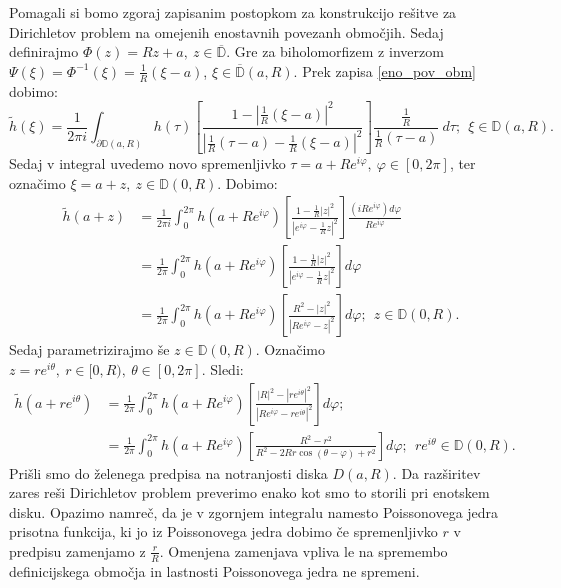 \documentclass[mat1]{fmfdelo}
\begin{document}
     \begin{dokaz}
        Pomagali si bomo zgoraj zapisanim postopkom za konstrukcijo rešitve za \mbox{Dirichletov} problem na omejenih enostavnih povezanh območjih. 
        Sedaj definirajmo $\Phi(z) = Rz + a,~z \in \overline{\mathbb{D}}$. Gre za biholomorfizem z inverzom \mbox{$\Psi(\xi) = \Phi^{-1}(\xi) = \frac{1}{R}(\xi - a)$}, $\xi \in \overline{\mathbb{D}}(a,R)$.
        Prek zapisa \eqref{eno_pov_obm} dobimo:
        $$ 
        \widetilde{h}(\xi) = \frac{1}{2\pi i}\int_{\partial \mathbb{D}(a,R)}{h(\tau) \left[\frac{1 - |\frac{1}{R}(\xi - a)|^2}{|\frac{1}{R}(\tau - a) - \frac{1}{R}(\xi - a)|^2}\right]\frac{\frac{1}{R}}{\frac{1}{R}(\tau - a)}~d \tau};~~\xi \in \mathbb{D}(a,R). 
        $$
        Sedaj v integral uvedemo novo spremenljivko $\tau = a + Re^{i \varphi},~\varphi \in [0,2\pi]$, ter označimo $\xi = a + z,~z \in \mathbb{D}(0, R)$. Dobimo:
        \begin{align*}
            \widetilde{h}(a + z) &= \frac{1}{2\pi i}\int_{0}^{2 \pi}{h(a + R e^{i \varphi}) \left[\frac{1 - \frac{1}{R}|z|^2}{|e^{i \varphi} - \frac{1}{R} z|^2}\right]\frac{(i R e^{i \varphi}) d \varphi}{R e^{i \varphi}}}\\
            & = \frac{1}{2 \pi}\int_{0}^{2 \pi}{h(a + R e^{i \varphi}) \left[\frac{1 - \frac{1}{R}|z|^2}{|e^{i \varphi} - \frac{1}{R} z|^2}\right]d\varphi}\\
            & = \frac{1}{2 \pi}\int_{0}^{2 \pi}{h(a + R e^{i \varphi}) \left[\frac{R^2 - |z|^2}{|R e^{i \varphi} - z|^2}\right]d\varphi};~~z \in \mathbb{D}(0,R).
        \end{align*}
        Sedaj parametrizirajmo še $z \in \mathbb{D}(0,R)$. Označimo $z = r e^{i \theta},~r \in [0,R),~\theta \in [0,2 \pi]$. Sledi:
        \begin{align*}
            \widetilde{h}(a + r e^{i \theta}) &= \frac{1}{2 \pi}\int_{0}^{2 \pi}{h(a + R e^{i \varphi}) \left[\frac{|R|^2 - |r e^{i \theta}|^2}{|R e^{i \varphi} - r e^{i \theta}|^2}\right]d\varphi}; \\
            & = \frac{1}{2 \pi}\int_{0}^{2 \pi}{h(a + R e^{i \varphi}) \left[\frac{R^2 - r^2}{R^2 - 2Rr \cos(\theta - \varphi) + r^2}\right]d\varphi};~~r e^{i \theta} \in \mathbb{D}(0,R).
        \end{align*}
        Prišli smo do želenega predpisa na notranjosti diska $D(a,R)$. Da razširitev zares reši Dirichletov problem preverimo enako kot smo to storili pri enotskem disku. 
        Opazimo namreč, da je v zgornjem integralu namesto Poissonovega jedra prisotna funkcija, ki jo iz Poissonovega jedra dobimo če spremenljivko $r$ v predpisu zamenjamo z $\frac{r}{R}$. 
        Omenjena zamenjava vpliva le na spremembo definicijskega območja in lastnosti Poissonovega jedra ne spremeni.
     \end{dokaz}
\end{document}
